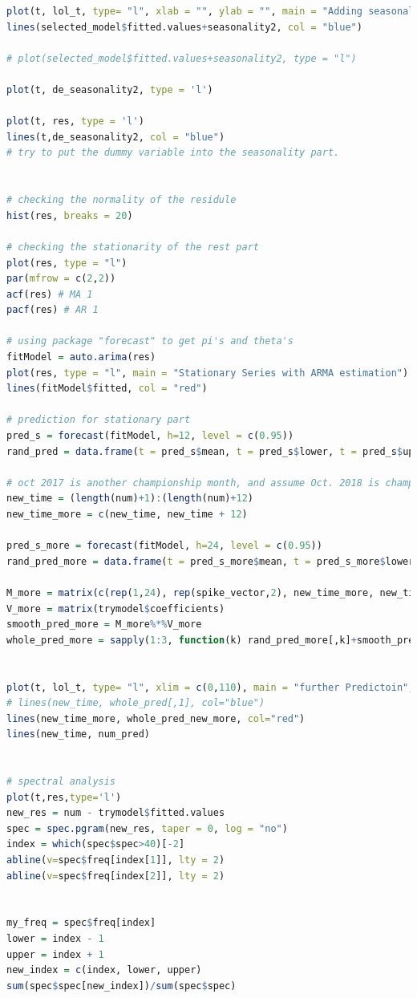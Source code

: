 \documentclass[11pt,a4paper]{article}
\begin{document}
\begin{itemize}
\begin{lstlisting}[language=R]
plot(t, lol_t, type= "l", xlab = "", ylab = "", main = "Adding seasonality")
lines(selected_model$fitted.values+seasonality2, col = "blue")

# plot(selected_model$fitted.values+seasonality2, type = "l")

plot(t, de_seasonality2, type = 'l')

plot(t, res, type = 'l')
lines(t,de_seasonality2, col = "blue")
# try to put the dummy variable into the seasonality part.


# checking the normality of the residule
hist(res, breaks = 20)

# checking the stationarity of the rest part
plot(res, type = "l")
par(mfrow = c(2,2))
acf(res) # MA 1
pacf(res) # AR 1

# using package "forecast" to get pi's and theta's
fitModel = auto.arima(res)
plot(res, type = "l", main = "Stationary Series with ARMA estimation")
lines(fitModel$fitted, col = "red")

# prediction for stationary part
pred_s = forecast(fitModel, h=12, level = c(0.95))
rand_pred = data.frame(t = pred_s$mean, t = pred_s$lower, t = pred_s$upper)

# oct 2017 is another championship month, and assume Oct. 2018 is championship month
new_time = (length(num)+1):(length(num)+12)
new_time_more = c(new_time, new_time + 12)

pred_s_more = forecast(fitModel, h=24, level = c(0.95))
rand_pred_more = data.frame(t = pred_s_more$mean, t = pred_s_more$lower, t = pred_s_more$upper)

M_more = matrix(c(rep(1,24), rep(spike_vector,2), new_time_more, new_time_more^2, new_time_more^3, new_time_more^4, new_time_more^5), ncol = 7)
V_more = matrix(trymodel$coefficients)
smooth_pred_more = M_more%*%V_more
whole_pred_more = sapply(1:3, function(k) rand_pred_more[,k]+smooth_pred_more)


plot(t, lol_t, type= "l", xlim = c(0,110), main = "further Predictoin", xlab = "time", ylab = "freq")
# lines(new_time, whole_pred[,1], col="blue")
lines(new_time_more, whole_pred_new_more, col="red")
lines(new_time, num_pred)


# spectral analysis
plot(t,res,type='l')
new_res = num - trymodel$fitted.values
spec = spec.pgram(new_res, taper = 0, log = "no")
index = which(spec$spec>40)[-2]
abline(v=spec$freq[index[1]], lty = 2)
abline(v=spec$freq[index[2]], lty = 2)


my_freq = spec$freq[index]
lower = index - 1
upper = index + 1
new_index = c(index, lower, upper)
sum(spec$spec[new_index])/sum(spec$spec)



\end{lstlisting}
\end{itemize}
\end{document}
